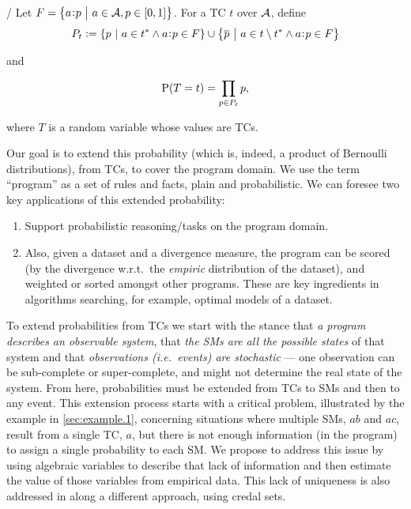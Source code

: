 \documentclass[a4paper, 10pt]{article}
\newcommand{\at}[1]{\ensuremath{\!\del{#1}}}
\newcommand{\co}[1]{\ensuremath{\overline{#1}}}
\newcommand{\fml}[1]{\ensuremath{{\cal #1}}}
\newcommand{\pr}[1]{\ensuremath{\mathrm{P}\at{#1}}}
\newcommand{\given}{\ensuremath{~\middle|~}}
\newcommand{\probfact}[2]{\ensuremath{#2\mkern-4mu:\mkern-4mu#1}}
\newcounter{remark}
\newcommand{\note}[1]{
    \stepcounter{remark}%
    {\!\!\color{red}/}\footnotemark[\arabic{remark}]\!\!%
    \footnotetext[\arabic{remark}]{{\color{red}/}#1}
}
\begin{document}
\note{revisit this part.}Let $F = \set{\probfact{p}{a} \given a \in \fml{A}, p \in \intcc{0, 1}}$. For a \acl{TC} $t$ over $\fml{A}$, define
$$
P_t := \set{ p \given a \in t^{\ast} \wedge \probfact{p}{a} \in F} \cup 
    \set{\co{p} \given a \in t \setminus t^{\ast} \wedge \probfact{p}{a} \in F}
$$

and

\begin{equation}
    \pr{T = t} = \prod_{p \in P_t} p,
    \label{eq:prob.total.choice}
\end{equation}

where $T$ is a random variable whose values are \aclp{TC}.

Our goal is to extend this probability (which is, indeed, a product of Bernoulli distributions), from \aclp{TC}, to cover the program domain. We use the term ``program'' as a set of rules and facts, plain and probabilistic. We can foresee two key applications of this extended probability:

\begin{enumerate}
    \item Support probabilistic reasoning/tasks on the program domain.
    \item Also, given a dataset and a divergence measure, the program can be scored (by the divergence w.r.t.\ the \emph{empiric} distribution of the dataset), and weighted or sorted amongst other programs. These are key ingredients in algorithms searching, for example, optimal models of a dataset.
\end{enumerate}

To extend probabilities from \aclp{TC} we start with the stance that \emph{a program describes an observable system}, that \emph{the \aclp{SM} are all the possible states} of that system and that \emph{observations (i.e.\ events) are stochastic} --- one observation can be sub-complete or super-complete, and might not determine the real state of the system. From here, probabilities must be extended from \acp{TC} to \acp{SM} and then to any event.
%
This extension process starts with a critical problem, illustrated by the  example in \cref{sec:example.1}, concerning situations where multiple \acp{SM}, $ab$ and $ac$, result from a single \ac{TC}, $a$, but there is not enough information (in the program) to assign a single probability to each \ac{SM}. We propose to address this issue by using algebraic variables to describe that lack of information and then estimate the value of those variables from empirical data. This lack of uniqueness is also addressed in \cite{cozman2020joy} along a different approach, using credal sets.
\end{document}
